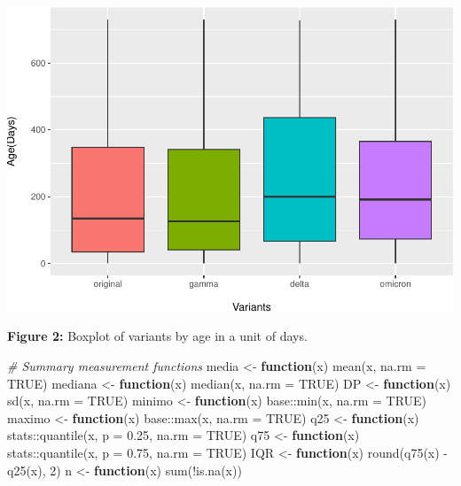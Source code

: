 \documentclass[
]{article}
\newenvironment{Shaded}{\begin{snugshade}}{\end{snugshade}}
\newcommand{\AttributeTok}[1]{\textcolor[rgb]{0.77,0.63,0.00}{#1}}
\newcommand{\CommentTok}[1]{\textcolor[rgb]{0.56,0.35,0.01}{\textit{#1}}}
\newcommand{\ConstantTok}[1]{\textcolor[rgb]{0.00,0.00,0.00}{#1}}
\newcommand{\ControlFlowTok}[1]{\textcolor[rgb]{0.13,0.29,0.53}{\textbf{#1}}}
\newcommand{\DecValTok}[1]{\textcolor[rgb]{0.00,0.00,0.81}{#1}}
\newcommand{\FloatTok}[1]{\textcolor[rgb]{0.00,0.00,0.81}{#1}}
\newcommand{\FunctionTok}[1]{\textcolor[rgb]{0.00,0.00,0.00}{#1}}
\newcommand{\NormalTok}[1]{#1}
\newcommand{\OtherTok}[1]{\textcolor[rgb]{0.56,0.35,0.01}{#1}}
\newcommand{\SpecialCharTok}[1]{\textcolor[rgb]{0.00,0.00,0.00}{#1}}
\renewenvironment{Shaded}{\begin{mdframed}[ backgroundcolor=shadecolor, linecolor = shadecolor, leftmargin=\dimexpr\leftmargin-2pt\relax, innerleftmargin=1.6pt, innertopmargin=5pt, skipabove=10pt,skipbelow=3pt ]}{\end{mdframed}}
\begin{document}
\includegraphics{age_analysis_files/figure-latex/unnamed-chunk-4-1.pdf}

\textbf{Figure 2:} Boxplot of variants by age in a unit of days.

\begin{Shaded}
\begin{Highlighting}[]
\CommentTok{\# Summary measurement functions}
\NormalTok{media }\OtherTok{\textless{}{-}} \ControlFlowTok{function}\NormalTok{(x) }
  \FunctionTok{mean}\NormalTok{(x, }\AttributeTok{na.rm =} \ConstantTok{TRUE}\NormalTok{)}
\NormalTok{mediana }\OtherTok{\textless{}{-}} \ControlFlowTok{function}\NormalTok{(x)}
  \FunctionTok{median}\NormalTok{(x, }\AttributeTok{na.rm =} \ConstantTok{TRUE}\NormalTok{)}
\NormalTok{DP }\OtherTok{\textless{}{-}} \ControlFlowTok{function}\NormalTok{(x)}
  \FunctionTok{sd}\NormalTok{(x, }\AttributeTok{na.rm =} \ConstantTok{TRUE}\NormalTok{)}
\NormalTok{minimo }\OtherTok{\textless{}{-}} \ControlFlowTok{function}\NormalTok{(x)}
\NormalTok{  base}\SpecialCharTok{::}\FunctionTok{min}\NormalTok{(x, }\AttributeTok{na.rm =} \ConstantTok{TRUE}\NormalTok{)}
\NormalTok{maximo }\OtherTok{\textless{}{-}} \ControlFlowTok{function}\NormalTok{(x) }
\NormalTok{  base}\SpecialCharTok{::}\FunctionTok{max}\NormalTok{(x, }\AttributeTok{na.rm =} \ConstantTok{TRUE}\NormalTok{)}
\NormalTok{q25 }\OtherTok{\textless{}{-}} \ControlFlowTok{function}\NormalTok{(x) }
\NormalTok{  stats}\SpecialCharTok{::}\FunctionTok{quantile}\NormalTok{(x, }\AttributeTok{p =} \FloatTok{0.25}\NormalTok{, }\AttributeTok{na.rm =} \ConstantTok{TRUE}\NormalTok{)}
\NormalTok{q75 }\OtherTok{\textless{}{-}} \ControlFlowTok{function}\NormalTok{(x)}
\NormalTok{  stats}\SpecialCharTok{::}\FunctionTok{quantile}\NormalTok{(x, }\AttributeTok{p =} \FloatTok{0.75}\NormalTok{, }\AttributeTok{na.rm =} \ConstantTok{TRUE}\NormalTok{)}
\NormalTok{IQR }\OtherTok{\textless{}{-}} \ControlFlowTok{function}\NormalTok{(x) }
  \FunctionTok{round}\NormalTok{(}\FunctionTok{q75}\NormalTok{(x) }\SpecialCharTok{{-}} \FunctionTok{q25}\NormalTok{(x), }\DecValTok{2}\NormalTok{)}
\NormalTok{n }\OtherTok{\textless{}{-}} \ControlFlowTok{function}\NormalTok{(x) }
  \FunctionTok{sum}\NormalTok{(}\SpecialCharTok{!}\FunctionTok{is.na}\NormalTok{(x))}
\end{Highlighting}
\end{Shaded}
\end{document}
